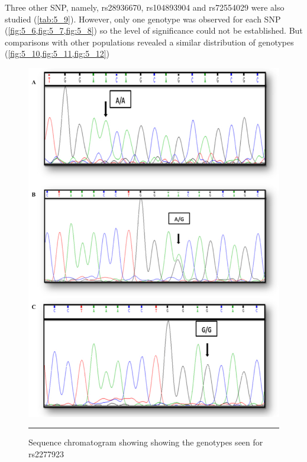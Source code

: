 \begin{refsection}
Three other SNP, namely, rs28936670, rs104893904 and rs72554029 were also studied (\cref{tab:5_9}). However, only one genotype was observed for each SNP (\cref{fig:5_6,fig:5_7,fig:5_8}) so the level of significance could not be established. But comparisons with other populations revealed a similar distribution of genotypes (\cref{fig:5_10,fig:5_11,fig:5_12}) 


\begin{figure}[!hp]
\centering
\includegraphics[width=\linewidth]{Figures/Figure5_5.pdf}
\rule{35em}{0.5pt}
\caption{Sequence chromatogram showing showing the genotypes seen for rs2277923}
\label{fig:5_5}
\end{figure}


\end{refsection}
